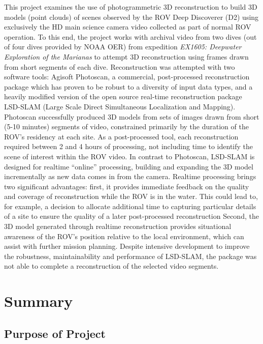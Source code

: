 \documentclass[letterpaper,12pt]{article}
\begin{document}
This project examines the use of photogrammetric 3D reconstruction to build 3D models (point clouds) of scenes observed by the ROV Deep Discoverer (D2) using exclusively the HD main science camera video collected as part of normal ROV operation.   To this end, the project works with archival video from two dives (out of four dives provided by NOAA OER) from expedition \textit{EX1605: Deepwater Exploration of the Marianas} to attempt 3D reconstruction using frames drawn from short segments of each dive.   Reconstruction was attempted with two software tools: Agisoft Photoscan, a commercial, post-processed reconstruction package which has proven to be robust to a diversity of input data types, and a heavily modified version of the open source real-time reconstruction package LSD-SLAM (Large Scale Direct Simultaneous Localization and Mapping).   Photoscan successfully produced 3D models from sets of images drawn from short (5-10 minutes) segments of video, constrained primarily by the duration of the ROV's residency at each site.    As a post-processed tool, each reconstruction required between 2 and 4 hours of processing, not including time to identify the scene of interest within the ROV video.  In contrast to Photoscan, LSD-SLAM is designed for realtime ``online'' processing, building and expanding the 3D model incrementally as new data comes in from the camera.    Realtime processing brings two significant advantages:   first, it provides immediate feedback on the quality and coverage of reconstruction while the ROV is in the water.   This could lead to, for example, a decision to allocate additional time to capturing particular details of a site to ensure the quality of a later post-processed reconstruction   Second, the 3D model generated through realtime reconstruction provides situational awareness of the ROV's position relative to the local environment, which can assist with further mission planning.    Despite intensive development to improve the robustness, maintainability and performance of LSD-SLAM, the package was not able to complete a reconstruction of the selected video segments. 

\section{Summary}

\subsection{Purpose of Project}
\end{document}
